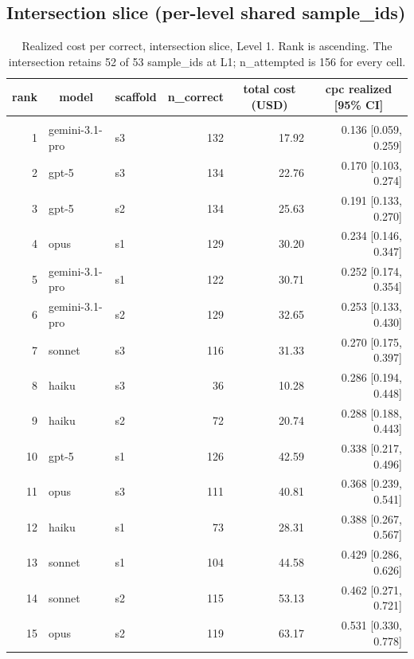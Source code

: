 \documentclass[10pt]{article} %
\begin{document}
    \FloatBarrier
    \subsection{Intersection slice (per-level shared sample\_ids)}\label{app:cpc_intersection}

    \begin{table}[t]
            \caption{Realized cost per correct, intersection slice, Level 1. Rank is ascending. The intersection retains 52 of 53 sample\_ids at L1; n\_attempted is 156 for every cell.}
        \label{tab:cpc_intersection_L1_ranked}
        \begin{center}
        \small
        \begin{tabular}{rllrrr}
            \multicolumn{1}{c}{\bf rank} & \multicolumn{1}{c}{\bf model} & \multicolumn{1}{c}{\bf scaffold} & \multicolumn{1}{c}{\bf n\_correct} & \multicolumn{1}{c}{\bf total cost (USD)} & \multicolumn{1}{c}{\bf cpc realized [95\% CI]} \\
            \hline \\
            1 & gemini-3.1-pro & s3 & 132 & 17.92 & 0.136 [0.059, 0.259] \\
            2 & gpt-5 & s3 & 134 & 22.76 & 0.170 [0.103, 0.274] \\
            3 & gpt-5 & s2 & 134 & 25.63 & 0.191 [0.133, 0.270] \\
            4 & opus & s1 & 129 & 30.20 & 0.234 [0.146, 0.347] \\
            5 & gemini-3.1-pro & s1 & 122 & 30.71 & 0.252 [0.174, 0.354] \\
            6 & gemini-3.1-pro & s2 & 129 & 32.65 & 0.253 [0.133, 0.430] \\
            7 & sonnet & s3 & 116 & 31.33 & 0.270 [0.175, 0.397] \\
            8 & haiku & s3 & 36 & 10.28 & 0.286 [0.194, 0.448] \\
            9 & haiku & s2 & 72 & 20.74 & 0.288 [0.188, 0.443] \\
            10 & gpt-5 & s1 & 126 & 42.59 & 0.338 [0.217, 0.496] \\
            11 & opus & s3 & 111 & 40.81 & 0.368 [0.239, 0.541] \\
            12 & haiku & s1 & 73 & 28.31 & 0.388 [0.267, 0.567] \\
            13 & sonnet & s1 & 104 & 44.58 & 0.429 [0.286, 0.626] \\
            14 & sonnet & s2 & 115 & 53.13 & 0.462 [0.271, 0.721] \\
            15 & opus & s2 & 119 & 63.17 & 0.531 [0.330, 0.778] \\
        \end{tabular}
        \end{center}
        \end{table}
        
\end{document}
